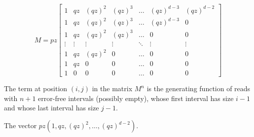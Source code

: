 \documentclass{article}
\begin{document}
\begin{equation}
M = pz\left[
\begin{matrix}
1 & qz  & (qz)^2 & (qz)^3 & \ldots & (qz)^{d-3} & (qz)^{d-2} \\
1 & qz  & (qz)^2 & (qz)^3 & \ldots & (qz)^{d-3} & 0          \\
1 & qz  & (qz)^2 & (qz)^3 & \ldots & 0          & 0          \\
\vdots & \vdots & \vdots & \vdots & \ddots & \vdots & \vdots \\
1 & qz  & (qz)^2 & 0      & \ldots & 0          & 0          \\
1 & qz  & 0      & 0      & \ldots & 0          & 0          \\
1 & 0   & 0      & 0      & \ldots & 0          & 0
\end{matrix}
\right]
\end{equation}

The term at position $(i,j)$ in the matrix $M^n$ is the generating
function of reads with $n+1$ error-free intervals (possibly empty), whose
first interval has size $i-1$ and whose last interval has size $j-1$.

The vector $pz(1, qz, (qz)^2, \ldots, (qz)^{d-2})$.







\end{document}
